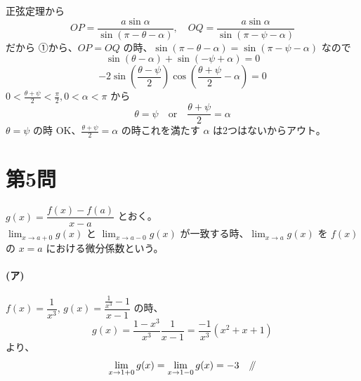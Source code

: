 \documentclass[../main.tex]{subfiles}
\begin{document}
\begin{center}
\end{center}

\noindent
正弦定理から
\[
  OP = \frac{a \sin\alpha}{\sin(\pi - \theta - \alpha)}, \quad OQ = \frac{a \sin\alpha}{\sin(\pi - \psi - \alpha)}
\]
だから ①から、$OP = OQ$ の時、$\sin(\pi - \theta - \alpha) = \sin(\pi - \psi - \alpha)$ なので
\[
  \sin(\theta - \alpha) + \sin(-\psi + \alpha) = 0
\]
\[
  -2 \sin\left(\frac{\theta - \psi}{2}\right) \cos\left(\frac{\theta + \psi}{2} - \alpha\right) = 0
\]
$0 < \frac{\theta + \psi}{2} < \frac{\pi}{2}, 0 < \alpha < \pi$ から
\[
  \theta = \psi \quad \text{or} \quad \frac{\theta + \psi}{2} = \alpha
\]
$\theta = \psi$ の時 OK、$\frac{\theta + \psi}{2} = \alpha$ の時これを満たす $\alpha$ は2つはないからアウト。

\newpage

\section*{第5問}

\noindent
[\textbf{解}] $g(x) = \dfrac{f(x) - f(a)}{x - a}$ とおく。\\
$\displaystyle \lim_{x \to a+0} g(x)$ と $\displaystyle \lim_{x \to a-0} g(x)$ が一致する時、$\displaystyle \lim_{x \to a} g(x)$ を $f(x)$ の $x = a$ における微分係数という。

\paragraph{(ア)} $f(x) = \dfrac{1}{x^3}$, $g(x) = \dfrac{\frac{1}{x^3} - 1}{x - 1}$ の時、
\[
  g(x) = \frac{1 - x^3}{x^3} \frac{1}{x - 1} = \frac{-1}{x^3}(x^2 + x + 1)
\]
より、
\[
  \lim_{x \to 1+0} g(x) = \lim_{x \to 1-0} g(x) = -3 \quad \mathbin{/\mkern-5mu/}
\]
\end{document}
